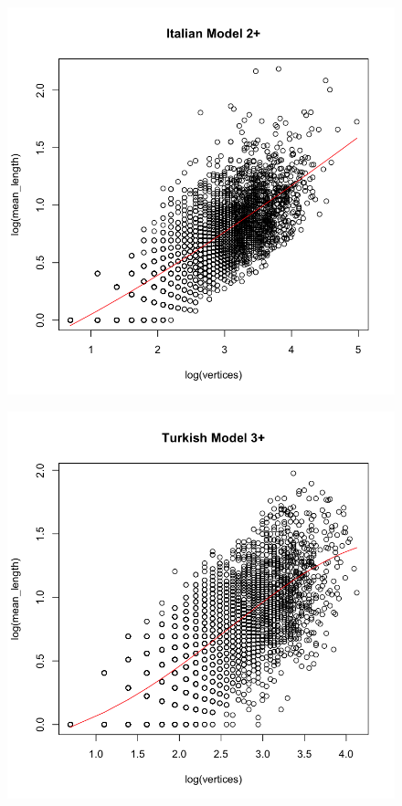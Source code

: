 \documentclass[paper=a4, fontsize=11pt]{scrartcl} %
\begin{document}
\begin{figure}
\begin{minipage}{.5\textwidth}
  \label{fig:8}
\end{minipage}
\end{figure}


\begin{figure}
\centering
\begin{minipage}{.5\textwidth}
  \centering
  \includegraphics[width=\linewidth]{bestModel_Italian.png}
  \label{fig:9}
\end{minipage}%
\begin{minipage}{.5\textwidth}
  \centering
  \includegraphics[width=\linewidth]{bestModel_Turkish.png}

\end{minipage}
\end{figure}
\end{document}
